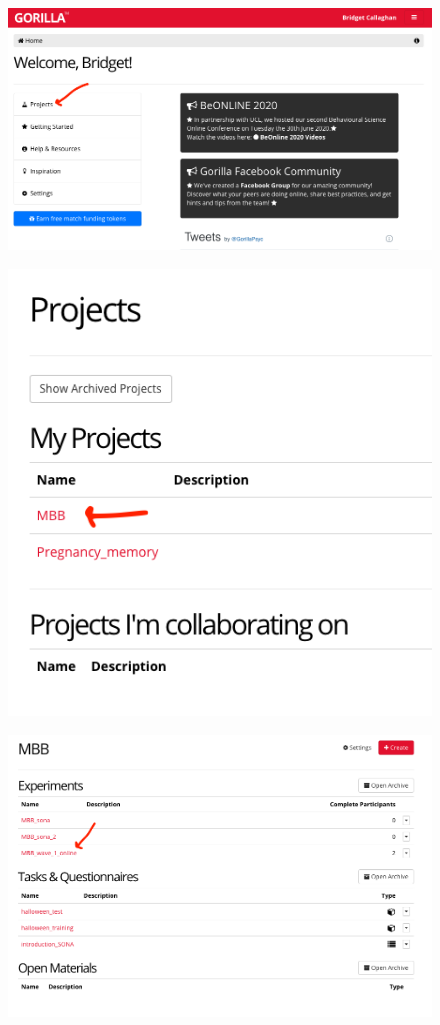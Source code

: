 \documentclass[]{book}
\begin{document}
\begin{figure}
\centering
\includegraphics{images/gorilla/1.png}
\caption{}
\end{figure}

\begin{figure}
\centering
\includegraphics{images/gorilla/2.png}
\caption{}
\end{figure}

\begin{figure}
\centering
\includegraphics{images/gorilla/3.png}
\caption{}
\end{figure}
\end{document}
